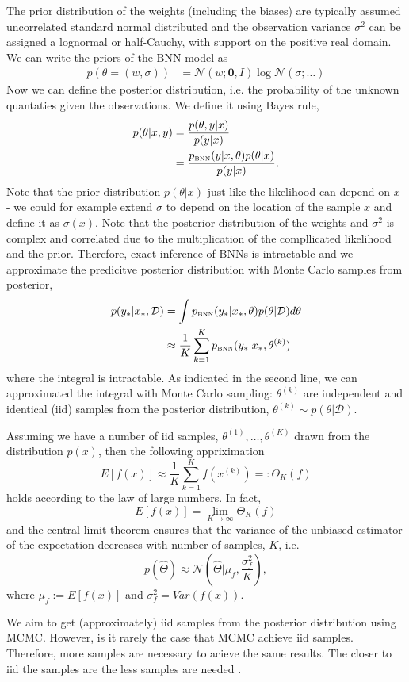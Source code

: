 The prior distribution of the weights (including the biases) are typically assumed uncorrelated
standard normal distributed and the observation variance $\sigma^2$ can be assigned a lognormal or
half-Cauchy, with support on the positive real domain. We can write the priors of the BNN model as
\begin{align*}
    p(\theta = (w, \sigma)) &= \mathcal{N}(w;\textbf{0},I) \log\mathcal{N}(\sigma;\dots)
\end{align*}
Now we can define the posterior distribution, i.e. the probability of the unknown quantaties given
the observations. We define it using Bayes rule, 
\begin{align*}
    p(\theta|x,y) &= \frac{p(\theta,y|x)}{p(y|x)}\\
    &=\frac{p_{\text{\tiny BNN}}(y|x, \theta)p(\theta|x)}{p(y|x)}.
\end{align*}
Note that the prior distribution $p(\theta|x)$ just like the likelihood can depend on $x$ - we could
for example extend $\sigma$ to depend on the location of the sample $x$ and define it as
$\sigma(x)$. Note that the posterior distribution of the weights and $\sigma^2$ is
complex and correlated due to the multiplication of the compllicated likelihood and the prior. 
Therefore, exact inference of BNNs is intractable and we approximate the predicitve posterior distribution 
with Monte Carlo samples from posterior, 
\begin{align*}
    p(y_*|x_*,\mathcal{D}) &= \int p_{\text{\tiny BNN}}(y_*|x_*, \theta)p(\theta|\mathcal{D})d\theta\\
    &\approx \frac{1}{K} \sum_{k=1}^K p_{\text{\tiny BNN}}(y_*|x_*, \theta^{(k)})
\end{align*}
where the integral is intractable. As indicated in the second line, we can approximated the integral
with Monte Carlo sampling: $\theta^{(k)}$ are independent and identical (iid) samples from the
posterior distribution, $\theta^{(k)} \sim p(\theta|\mathcal{D})$. 
\begin{testexample2}
    Assuming we have a number of iid samples, $\theta^{(1)}, \dots, \theta^{(K)}$ drawn from the
    distribution $p(x)$, then the following appriximation $$E[f(x)] \approx \frac{1}{K} \sum_{k=1}^K
    f(x^{(k)}) =: \Theta_{K}(f)$$ holds according to the law of large numbers. In fact,  $$E[f(x)] =
    \lim_{K \rightarrow \infty} \Theta_{K}(f)$$ and the central limit theorem ensures that the
    variance of the unbiased estimator of the expectation decreases with number of samples, $K$, i.e.
    $$p(\hat \Theta)  \approx  \mathcal{N}(\hat \Theta |\mu_f,
    \frac{\sigma_f^2}{K}),$$ where $\mu_f := E[f(x)] $ and $\sigma_f^2 =
    Var(f(x))$. \cite[708]{ML_Bayesian_Pespective}
\end{testexample2}
We aim to get (approximately) iid samples from the posterior distribution using MCMC. However,
is it rarely the case that MCMC achieve iid samples. Therefore, more samples are necessary to acieve the same results. The
closer to iid the samples are the less samples are needed \cite[12]{MCMC}.

